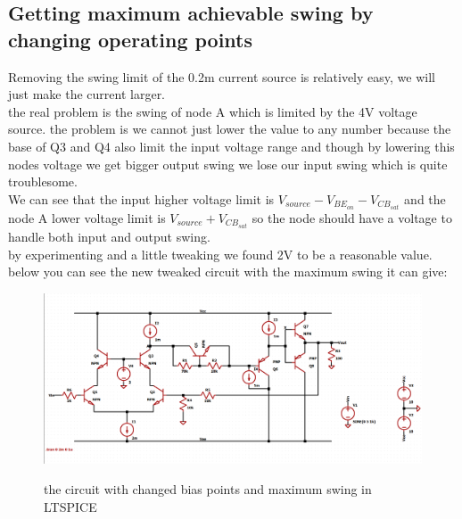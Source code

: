\documentclass[11pt]{article}
\begin{document}
\subsection{Getting maximum achievable swing by changing operating points}
Removing the swing limit of the 0.2m current source is relatively easy, we will just make the current larger. \\
the real problem is the swing of node A which is limited by the 4V voltage source.
the problem is we cannot just lower the value to any number because the base of Q3 and Q4 also
limit the input voltage range and though by lowering this nodes voltage we get bigger output swing
we lose our input swing which is quite troublesome.\\
We can see that the input higher voltage limit is $ V_{source} - V_{BE_{on}} - V_{CB_{sat}} $ and the node A
lower voltage limit is $ V_{source} + V_{CB_{sat}} $ so the node should have a voltage to
handle both input and output swing. \\
by experimenting and a little tweaking we found 2V to be a reasonable value. \\
below you can see the new tweaked circuit with the maximum swing it can give: \\  

\begin{figure}[H]
    \begin{center}
        \includegraphics[scale=0.45]{Fig/circuitBasicTweaked.png}
        \label{fig:TweakedCircuit}
        \caption{the circuit with changed bias points and maximum swing in LTSPICE}
    \end{center}
\end{figure}
\end{document}
